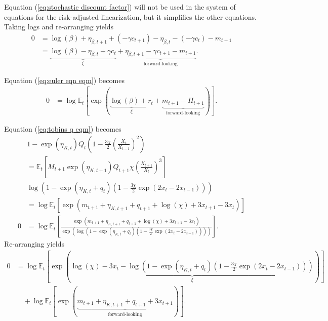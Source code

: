 \documentclass[12 pt, oneside]{article}
\theoremstyle{definition}
\theoremstyle{definition}
\theoremstyle{definition}
\newcommand{\E}{\mathbb{E}}
\begin{document}
Equation (\ref{eq:stochastic discount factor}) will not be used in the system of equations for the risk-adjusted linearization,
but it simplifies the other equations. Taking logs and re-arranging yields
\begin{align*}
  0 & =  \log(\beta) + \eta_{\beta, t + 1} + (-\gamma c_{t + 1}) - \eta_{\beta, t} - (-\gamma c_t) - m_{t + 1}\\
    & = \underbrace{\log(\beta) -\eta_{\beta, t} + \gamma c_t}_{\xi} + \underbrace{\eta_{\beta, t + 1} - \gamma c_{t + 1} - m_{t + 1}}_{\text{forward-looking}}.
\end{align*}

Equation (\ref{eq:euler eqn eqm}) becomes
\begin{align*}
  0 & = \log\E_t\left[\exp\left(\underbrace{\log(\beta) + r_t}_{\xi} + \underbrace{m_{t + 1} - \Pi_{t + 1}}_{\text{forward-looking}}  \right)\right].
\end{align*}

Equation (\ref{eq:tobins q eqm}) becomes
\begin{align*}
  & 1 - \exp(\eta_{K, t})Q_t\left(1 - \frac{3\chi}{2}\left(\frac{X_t}{X_{t - 1}}\right)^2\right)\\
  & = \E_t\left[M_{t + 1}\exp(\eta_{K, t + 1})Q_{t + 1}\chi\left(\frac{X_{t + 1}}{X_t}\right)^3\right]\\
  & \log\left(1 - \exp(\eta_{K, t} + q_t)\left(1 - \frac{3\chi}{2}\exp(2x_t - 2x_{t - 1})\right)\right)\\
  & = \log\E_t\left[\exp\left(m_{t + 1} + \eta_{K, t + 1} + q_{t + 1} + \log(\chi) + 3 x_{t + 1} - 3 x_t\right)\right]\\
  0 & = \log\E_t\left[\frac{\exp\left(m_{t + 1} + \eta_{K, t + 1} + q_{t + 1} + \log(\chi) + 3 x_{t + 1} - 3 x_t\right)}{\exp\left(\log\left(1 - \exp(\eta_{K, t} + q_t)\left(1 - \frac{3\chi}{2}\exp(2x_t - 2x_{t - 1})\right)\right)\right)}\right].
\end{align*}
Re-arranging yields
\begin{align*}
  0 & = \log\E_t\left[\exp\left(\underbrace{\log(\chi)- 3x_t - \log\left(1 - \exp(\eta_{K, t} + q_t)\left(1 - \frac{3\chi}{2}\exp(2x_t - 2x_{t - 1})\right)\right)}_{\xi}\right)\right]\\
    &\quad + \log \E_t\left[\exp(\underbrace{m_{t + 1} + \eta_{K, t + 1} + q_{t + 1} + 3x_{t + 1}}_{\text{forward-looking}})\right].
\end{align*}
\end{document}
